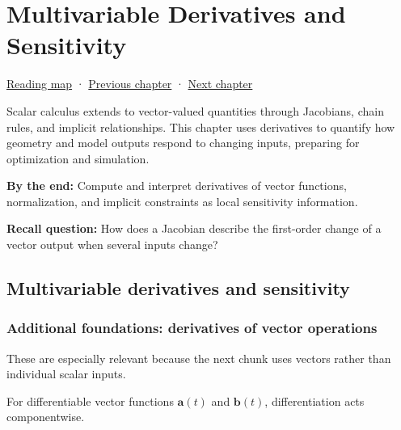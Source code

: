\chapter{Multivariable Derivatives and Sensitivity}\label{02-foundations-ii-ch021-multivariable-derivatives-and-sensitivity}\hypertarget{02-foundations-ii-ch021}{}\label{stagechapter:02-foundations-ii-ch021}

\hypertarget{02-foundations-ii-ch021-multivariable-derivatives-and-sensitivity}{}

\hyperref[volume-reading-map]{Reading map} · \hyperref[01-foundations-i-ch020-choose-matrix-factorizations-from-structure]{Previous chapter} · \hyperref[02-foundations-ii-ch022-accumulation-quadrature-and-the-bridge-to-probability]{Next chapter}

Scalar calculus extends to vector-valued quantities through Jacobians, chain rules, and implicit relationships. This chapter uses derivatives to quantify how geometry and model outputs respond to changing inputs, preparing for optimization and simulation.

\textbf{By the end:} Compute and interpret derivatives of vector functions, normalization, and implicit constraints as local sensitivity information.

\textbf{Recall question:} How does a Jacobian describe the first-order change of a vector output when several inputs change?

\section{Multivariable derivatives and sensitivity}\label{02-foundations-ii-ch021-multivariable-derivatives-and-sensitivity-1}

\hypertarget{02-foundations-ii-ch021-multivariable-derivatives-and-sensitivity-1}{}

\subsection{Additional foundations: derivatives of vector operations}\label{02-foundations-ii-ch021-additional-foundations-derivatives-of-vector-operations}

\hypertarget{02-foundations-ii-ch021-additional-foundations-derivatives-of-vector-operations}{}

These are especially relevant because the next chunk uses vectors rather than individual scalar inputs.

For differentiable vector functions \(\mathbf a(t)\) and \(\mathbf b(t)\), differentiation acts componentwise.

